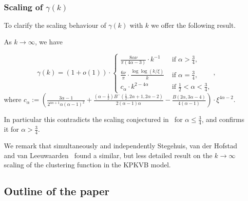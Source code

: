 
\subsubsection{Scaling of $\gamma(k)$}

To clarify the scaling behaviour of $\gamma(k)$ with $k$ we offer the following result.

\begin{proposition}\label{prop:asymp}
As $k\to\infty$, we have

$$ \gamma(k) = 
(1+o(1)) \cdot \left\{ \begin{array}{cl}
\frac{8\alpha \nu}{\pi\left(4\alpha - 3\right)} \cdot k^{-1} &\text{ if } \alpha > \frac{3}{4}, \\
\frac{6 \nu}{\pi} \cdot \frac{\log \log (k/\xi)}{k}& \text{ if } \alpha = \frac{3}{4},\\
 c_{\alpha} \cdot k^{2-4\alpha} & \text{ if } \frac12 < \alpha < \frac34, 
\end{array} \right.,
$$
where $c_{\alpha} := \left( \frac{3\alpha - 1}{2^{4\alpha+1}\alpha(\alpha-1)^2} 
	+ \frac{(\alpha - \frac{1}{2})B^-(\frac{1}{2},2\alpha + 1, 2\alpha - 2)}{2(\alpha - 1)\alpha} 
	- \frac{B(2\alpha, 3\alpha - 4)}{4(\alpha - 1)} \right)  \cdot \xi^{4\alpha-2}$.
\end{proposition}

In particular this contradicts the scaling conjectured in~\cite{krioukov2010hyperbolic} for $\alpha \leq \frac34$, and confirms it for $\alpha > \frac34$.

We remark that simultaneously and independently Stegehuis, van der Hofstad and van Leeuwaarden~\cite{stegehuis2018scale} found a similar, but less detailed result on the $k\to\infty$ scaling of the clustering function in the KPKVB model.




\subsection{Outline of the paper}


